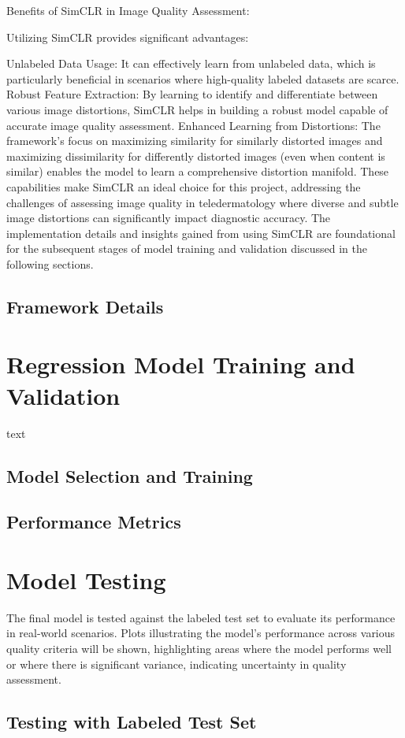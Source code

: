 Benefits of SimCLR in Image Quality Assessment:

Utilizing SimCLR provides significant advantages:

Unlabeled Data Usage: It can effectively learn from unlabeled data, which is particularly beneficial in scenarios where high-quality labeled datasets are scarce.
Robust Feature Extraction: By learning to identify and differentiate between various image distortions, SimCLR helps in building a robust model capable of accurate image quality assessment.
Enhanced Learning from Distortions: The framework’s focus on maximizing similarity for similarly distorted images and maximizing dissimilarity for differently distorted images (even when content is similar) enables the model to learn a comprehensive distortion manifold.
These capabilities make SimCLR an ideal choice for this project, addressing the challenges of assessing image quality in teledermatology where diverse and subtle image distortions can significantly impact diagnostic accuracy. The implementation details and insights gained from using SimCLR are foundational for the subsequent stages of model training and validation discussed in the following sections. \par
\vspace{\baselineskip}
\noindent

\subsection{Framework Details}
\label{sub:FrameworkDetails}


\section{Regression Model Training and Validation}
\label{sec:ModelTrainVal}
text \par
\vspace{\baselineskip}
\noindent

\subsection{Model Selection and Training}
\label{sub:ModelTraining}

\subsection{Performance Metrics}
\label{sub:PerfMetrics}


\section{Model Testing}
\label{sec:ModelTesting}
The final model is tested against the labeled test set to evaluate its performance in real-world scenarios. Plots illustrating the model’s performance across various quality criteria will be shown, highlighting areas where the model performs well or where there is significant variance, indicating uncertainty in quality assessment. \par
\vspace{\baselineskip}
\noindent

\subsection{Testing with Labeled Test Set}
\label{sub:TestLabeledSet}